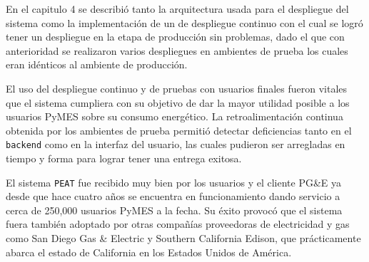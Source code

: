 En el capitulo 4 se describió tanto la arquitectura usada para el despliegue del
sistema como la implementación de un de despliegue continuo con el cual se logró
tener un despliegue en la etapa de producción sin problemas, dado el que
con anterioridad se realizaron varios despliegues en ambientes de prueba los cuales
eran idénticos al ambiente de producción.

El uso del despliegue continuo y de pruebas con usuarios finales fueron vitales
que el sistema cumpliera con su objetivo de dar la mayor utilidad posible
a los usuarios PyMES sobre su consumo energético. La retroalimentación continua
obtenida por los ambientes de prueba permitió detectar deficiencias tanto en el
\texttt{backend} como en la interfaz del usuario, las cuales pudieron ser arregladas
en tiempo y forma para lograr tener una entrega exitosa.

El sistema \texttt{PEAT} fue recibido muy bien por los usuarios y el cliente PG\&E
ya desde que hace cuatro años se encuentra en funcionamiento dando servicio a cerca
de 250,000 usuarios PyMES a la fecha\cite{30_pge_annual_report}. Su éxito provocó que
el sistema fuera también adoptado por otras compañías proveedoras de electricidad y
gas como San Diego Gas \& Electric y Southern California Edison, que prácticamente
abarca el estado de California en los Estados Unidos de América.
